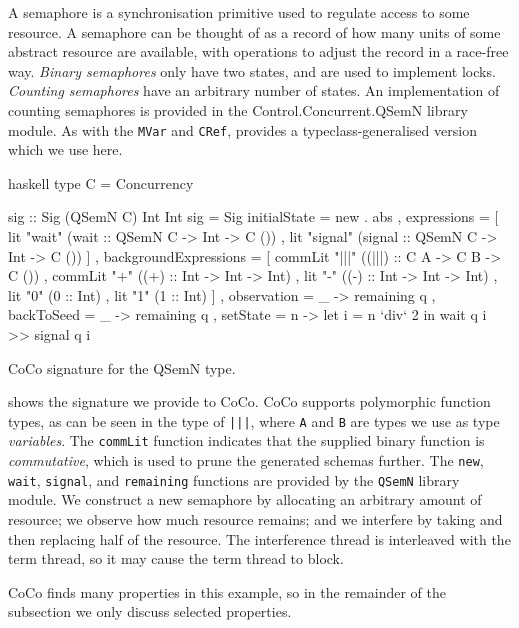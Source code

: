 A semaphore is a synchronisation primitive used to regulate access to
some resource.  A semaphore can be thought of as a record of how many
units of some abstract resource are available, with operations to
adjust the record in a race-free way.  \emph{Binary semaphores} only
have two states, and are used to implement locks. \emph{Counting
  semaphores} have an arbitrary number of states.  An implementation
of counting semaphores is provided in the Control.Concurrent.QSemN
library module.  As with the \verb|MVar| and \verb|CRef|, \dejafu{}
provides a typeclass-generalised version which we use here.

\begin{listing}
\centering
\begin{cminted}{haskell}
type C = Concurrency

sig :: Sig (QSemN C) Int Int
sig = Sig
  { initialState = new . abs
  , expressions =
    [ lit "wait"   (wait   :: QSemN C -> Int -> C ())
    , lit "signal" (signal :: QSemN C -> Int -> C ())
    ]
  , backgroundExpressions =
    [ commLit "|||" ((|||) :: C A -> C B -> C ())
    , commLit "+"   ((+)   :: Int -> Int -> Int)
    , lit "-"       ((-)   :: Int -> Int -> Int)
    , lit "0" (0 :: Int)
    , lit "1" (1 :: Int)
    ]
  , observation = \q _ -> remaining q
  , backToSeed  = \q _ -> remaining q
  , setState = \q n -> let i = n `div` 2 in wait q i >> signal q i
  }
\end{cminted}
\caption{CoCo signature for the QSemN type.}
\label{lst:sig}
\end{listing}

 shows the signature we provide to CoCo.  CoCo supports
polymorphic function types, as can be seen in the type of \verb#|||#,
where \verb|A| and \verb|B| are types we use as type \emph{variables}.
The \verb|commLit| function indicates that the supplied binary
function is \emph{commutative}, which is used to prune the generated
schemas further.  The \verb|new|, \verb|wait|, \verb|signal|, and
\verb|remaining| functions are provided by the \verb|QSemN| library
module.  We construct a new semaphore by allocating an arbitrary
amount of resource; we observe how much resource remains; and we
interfere by taking and then replacing half of the resource.  The
interference thread is interleaved with the term thread, so it may
cause the term thread to block.

CoCo finds many properties in this example, so in the remainder of the
subsection we only discuss selected properties.

